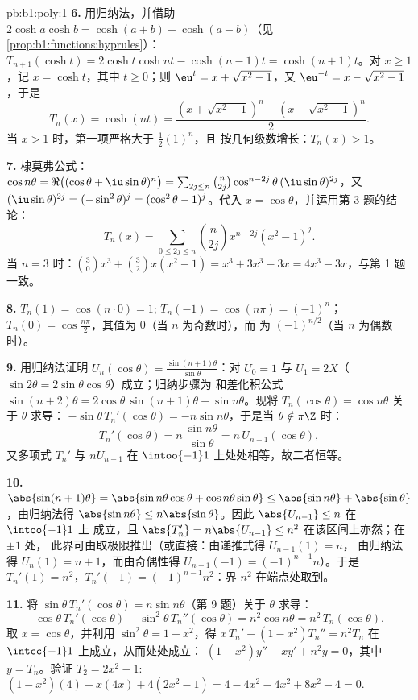 \begin{solution}{pb:b1:poly:1}
\textbf{6.} 用归纳法，并借助 $2\cosh a\cosh b = \cosh(a + b) +
\cosh(a - b)$（见\cref{prop:b1:functions:hyprules}）：$T_{n+1}(\cosh
t) = 2\cosh t\cosh nt - \cosh(n-1)t = \cosh(n+1)t$。对 $x \geq
1$，记 $x = \cosh t$，其中 $t \geq 0$；则 $\eu^t = x +
\sqrt{x^2 - 1}$，又 $\eu^{-t} = x - \sqrt{x^2 - 1}$，于是
\[
T_n(x) = \cosh(nt)
= \frac{(x + \sqrt{x^2-1})^n + (x - \sqrt{x^2-1})^n}2 .
\]
当 $x > 1$ 时，第一项严格大于 $\frac12(1)^n$，且
按几何级数增长：$T_n(x) > 1$。

\textbf{7.} 棣莫弗公式：$\cos n\theta = \Re\bigl((\cos\theta +
\iu\sin\theta)^n\bigr) = \sum_{2j \leq n}\binom n{2j}
\cos^{n-2j}\theta\,(\iu\sin\theta)^{2j}$，又 $(\iu\sin\theta)^{2j}
= (-\sin^2\theta)^j = (\cos^2\theta - 1)^j$。代入 $x =
\cos\theta$，并运用第 3 题的结论：
\[
T_n(x) = \sum_{0\leq 2j\leq n}\binom n{2j}x^{n-2j}(x^2 - 1)^j .
\]
当 $n = 3$ 时：$\binom30 x^3 + \binom32 x(x^2 - 1) = x^3 + 3x^3 -
3x = 4x^3 - 3x$，与第 1 题一致。

\textbf{8.} $T_n(1) = \cos(n\cdot0) = 1$; $T_n(-1) = \cos(n\pi) =
(-1)^n$；$T_n(0) = \cos\frac{n\pi}2$，其值为 $0$（当 $n$ 为奇数时），而
为 $(-1)^{n/2}$（当 $n$ 为偶数时）。

\textbf{9.} 用归纳法证明 $U_n(\cos\theta) =
\frac{\sin(n+1)\theta}{\sin\theta}$：对 $U_0 = 1$ 与 $U_1 =
2X$（$\sin2\theta = 2\sin\theta\cos\theta$）成立；归纳步骤为
和差化积公式 $\sin(n+2)\theta = 2\cos\theta\,
\sin(n+1)\theta - \sin n\theta$。现将
$T_n(\cos\theta) = \cos n\theta$ 关于 $\theta$ 求导：
$-\sin\theta\,T_n'(\cos\theta) = -n\sin n\theta$，于是当 $\theta
\notin \pi\Z$ 时：
\[
T_n'(\cos\theta) = n\,\frac{\sin n\theta}{\sin\theta}
= n\,U_{n-1}(\cos\theta) ,
\]
又多项式 $T_n'$ 与 $nU_{n-1}$ 在
$\intoo{-1}1$ 上处处相等，故二者恒等。

\textbf{10.} $\abs{\sin(n+1)\theta} = \abs{\sin n\theta\cos\theta
+ \cos n\theta\sin\theta} \leq \abs{\sin n\theta} +
\abs{\sin\theta}$，由归纳法得 $\abs{\sin n\theta} \leq
n\abs{\sin\theta}$。因此 $\abs{U_{n-1}} \leq n$ 在 $\intoo{-1}1$ 上
成立，且 $\abs{T_n'} = n\abs{U_{n-1}} \leq n^2$ 在该区间上亦然；在 $\pm1$ 处，
此界可由取极限推出（或直接：由递推式得 $U_{n-1}(1) = n$，
由归纳法得 $U_n(1) = n + 1$，而由奇偶性得
$U_{n-1}(-1) = (-1)^{n-1}n$）。于是 $T_n'(1) = n^2$，$T_n'(-1)
= (-1)^{n-1}n^2$：界 $n^2$ 在端点处取到。

\textbf{11.} 将 $\sin\theta\,T_n'(\cos\theta) = n\sin
n\theta$（第 9 题）关于 $\theta$ 求导：
\[
\cos\theta\,T_n'(\cos\theta) - \sin^2\theta\,T_n''(\cos\theta)
= n^2\cos n\theta = n^2\,T_n(\cos\theta) .
\]
取 $x = \cos\theta$，并利用 $\sin^2\theta = 1 - x^2$，得 $x\,T_n' - (1
- x^2)T_n'' = n^2T_n$ 在 $\intcc{-1}1$ 上成立，从而处处成立：
$(1 - x^2)y'' - xy' + n^2y = 0$，其中 $y = T_n$。验证 $T_2 =
2x^2 - 1$: $(1 - x^2)(4) - x(4x) + 4(2x^2 - 1) = 4 - 4x^2 - 4x^2
+ 8x^2 - 4 = 0$.


\end{solution}
